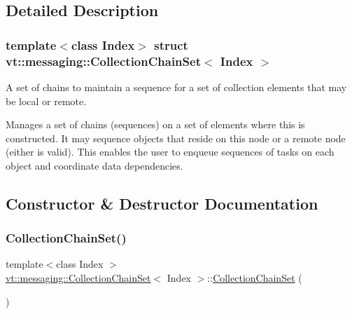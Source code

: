 \subsection{Detailed Description}
\subsubsection*{template$<$class Index$>$\newline
struct vt\+::messaging\+::\+Collection\+Chain\+Set$<$ Index $>$}

A set of chains to maintain a sequence for a set of collection elements that may be local or remote. 

Manages a set of chains (sequences) on a set of elements where this is constructed. It may sequence objects that reside on this node or a remote node (either is valid). This enables the user to enqueue sequences of tasks on each object and coordinate data dependencies. 

\subsection{Constructor \& Destructor Documentation}
\mbox{\label{classvt_1_1messaging_1_1_collection_chain_set_aeb43ad4a2e46ea059817b639b72ddb3b}} 
\subsubsection{\texorpdfstring{Collection\+Chain\+Set()}{CollectionChainSet()}\hspace{0.1cm}{\footnotesize\ttfamily [1/3]}}
{\footnotesize\ttfamily template$<$class Index $>$ \\
\hyperlink{classvt_1_1messaging_1_1_collection_chain_set}{vt\+::messaging\+::\+Collection\+Chain\+Set}$<$ Index $>$\+::\hyperlink{classvt_1_1messaging_1_1_collection_chain_set}{Collection\+Chain\+Set} (\begin{DoxyParamCaption}{ }\end{DoxyParamCaption})\hspace{0.3cm}{\ttfamily [default]}}

\mbox{\label{classvt_1_1messaging_1_1_collection_chain_set_a71328cb5c03210ffdb0bd5dd5f3b6797}} 
